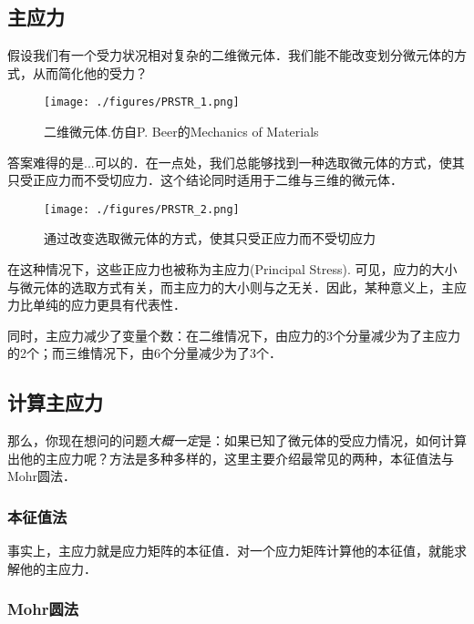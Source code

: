 
\begin{issues}
\issueDraft
\end{issues}

\subsection{主应力}
假设我们有一个受力状况相对复杂的二维微元体．我们能不能改变划分微元体的方式，从而简化他的受力？
\begin{figure}[ht]
\centering
\texttt{[image: ./figures/PRSTR\_1.png]}
\caption{二维微元体.仿自P. Beer的Mechanics of Materials} \label{PRSTR_fig1}
\end{figure}

答案难得的是...可以的．在一点处，我们总能够找到一种选取微元体的方式，使其只受正应力而不受切应力．这个结论同时适用于二维与三维的微元体．
\begin{figure}[ht]
\centering
\texttt{[image: ./figures/PRSTR\_2.png]}
\caption{通过改变选取微元体的方式，使其只受正应力而不受切应力} \label{PRSTR_fig2}
\end{figure}
在这种情况下，这些正应力也被称为主应力(Principal Stress). 可见，应力的大小与微元体的选取方式有关，而主应力的大小则与之无关．因此，某种意义上，主应力比单纯的应力更具有代表性．

同时，主应力减少了变量个数：在二维情况下，由应力的3个分量减少为了主应力的2个；而三维情况下，由6个分量减少为了3个．

\subsection{计算主应力}

那么，你现在想问的问题\textsl{大概一定}是：如果已知了微元体的受应力情况，如何计算出他的主应力呢？方法是多种多样的，这里主要介绍最常见的两种，本征值法与Mohr圆法．

\subsubsection{本征值法}
事实上，主应力就是应力矩阵的本征值．对一个应力矩阵计算他的本征值，就能求解他的主应力．

\subsubsection{Mohr圆法}
